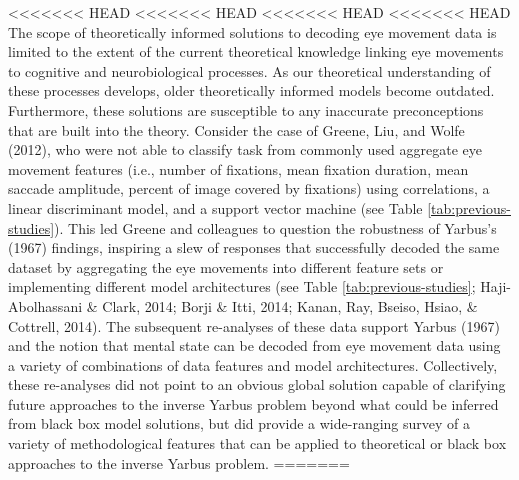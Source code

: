 \documentclass[
  english,
  man, donotrepeattitle,floatsintext]{apa6}
\begin{document}
<<<<<<< HEAD
<<<<<<< HEAD
<<<<<<< HEAD
<<<<<<< HEAD
The scope of theoretically informed solutions to decoding eye movement data is limited to the extent of the current theoretical knowledge linking eye movements to cognitive and neurobiological processes. As our theoretical understanding of these processes develops, older theoretically informed models become outdated. Furthermore, these solutions are susceptible to any inaccurate preconceptions that are built into the theory. Consider the case of Greene, Liu, and Wolfe (2012), who were not able to classify task from commonly used aggregate eye movement features (i.e., number of fixations, mean fixation duration, mean saccade amplitude, percent of image covered by fixations) using correlations, a linear discriminant model, and a support vector machine (see Table \ref{tab:previous-studies}). This led Greene and colleagues to question the robustness of Yarbus's (1967) findings, inspiring a slew of responses that successfully decoded the same dataset by aggregating the eye movements into different feature sets or implementing different model architectures (see Table \ref{tab:previous-studies}; Haji-Abolhassani \& Clark, 2014; Borji \& Itti, 2014; Kanan, Ray, Bseiso, Hsiao, \& Cottrell, 2014). The subsequent re-analyses of these data support Yarbus (1967) and the notion that mental state can be decoded from eye movement data using a variety of combinations of data features and model architectures. Collectively, these re-analyses did not point to an obvious global solution capable of clarifying future approaches to the inverse Yarbus problem beyond what could be inferred from black box model solutions, but did provide a wide-ranging survey of a variety of methodological features that can be applied to theoretical or black box approaches to the inverse Yarbus problem.
=======
\end{document}
